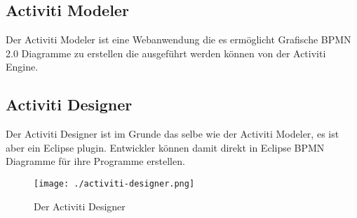 \subsection{Activiti Modeler}
Der Activiti Modeler ist eine Webanwendung die es ermöglicht Grafische BPMN 2.0 Diagramme zu erstellen die ausgeführt werden können von der Activiti Engine.

\subsection{Activiti Designer}
Der Activiti Designer ist im Grunde das selbe wie der Activiti Modeler, es ist aber ein Eclipse plugin. Entwickler können damit direkt in Eclipse BPMN Diagramme für ihre Programme erstellen.
\begin{figure}[htbp]
	\centering
		\texttt{[image: ./activiti-designer.png]}
	\caption{Der Activiti Designer}
	\label{fig:ActivitiDesigner}
\end{figure}
